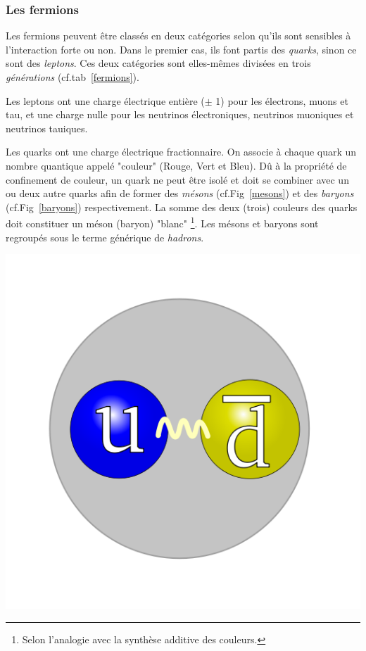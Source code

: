\subsubsection{Les fermions}
Les fermions peuvent être classés en deux catégories selon qu'ils sont sensibles à l'interaction forte ou non. Dans le premier cas, ils font partis des \textit{quarks}, sinon ce sont des \textit{leptons}. Ces deux catégories sont elles-mêmes divisées en trois \textit{générations} (cf.tab~\ref{fermions}).

Les leptons ont une charge électrique entière ($\pm$ \num{1}) pour les électrons, muons et tau, et une charge nulle pour les neutrinos électroniques, neutrinos muoniques et neutrinos tauiques.

Les quarks ont une charge électrique fractionnaire. On associe à chaque quark un nombre quantique appelé "couleur" (Rouge, Vert et Bleu). Dû à la propriété de confinement de couleur, un quark ne peut être isolé et doit se combiner avec un ou deux autre quarks afin de former des \textit{mésons} (cf.Fig~\ref{mesons}) et des \textit{baryons} (cf.Fig~\ref{baryons}) respectivement. La somme des deux (trois) couleurs des quarks doit constituer un méson (baryon) "blanc" \footnote{Selon l'analogie avec la synthèse additive des couleurs.}. Les mésons et baryons sont regroupés sous le terme générique de \textit{hadrons}.

\marginpar
{
	\centering
	\includegraphics[width=\marginparwidth]{SM/quarks2.png}
	\label{mesons}
}

